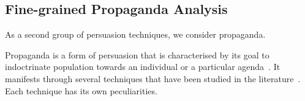 








\subsection{\statusorange Fine-grained Propaganda Analysis}
\label{ssec:lp_techniques_propaganda}

As a second group of persuasion techniques, we consider \gls{propaganda}.

Propaganda is a form of persuasion that is characterised by its goal to indoctrinate population towards an individual or a particular agenda~\citep{bernays}.
It manifests through several techniques that have been studied in the literature~\citep{torok2015symbiotic}. Each technique has its own peculiarities.

